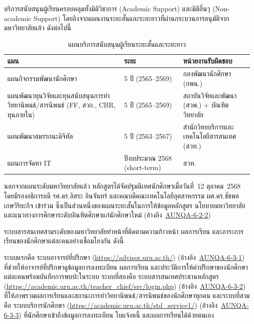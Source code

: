 
บริการสนับสนุนผู้เรียนครอบคลุมทั้งมิติวิชาการ (Academic Support) และมิติอื่นๆ (Non-academic Support) โดยอิงจากแผนงานระยะสั้นและระยะยาวที่ผ่านกระบวนการอนุมัติจากมหาวิทยาลัยแล้ว ดังต่อไปนี้

\begin{table}[H]
  \centering
  \caption{แผนบริการสนับสนุนผู้เรียนระยะสั้นและระยะยาว}
  \label{tbl:support_plans}
  \begingroup
  \footnotesize
  \setlength{\tabcolsep}{3pt}
  \renewcommand{\arraystretch}{1.2}
  \begin{tabularx}{\linewidth}{|>{\raggedright\arraybackslash}X|l|l|}
    \hline
    \textbf{แผน} & \textbf{ระยะ} & \textbf{หน่วยงานรับผิดชอบ} \\
    \hline
    แผนกิจกรรมพัฒนานักศึกษา & 5 ปี (2565--2569) & กองพัฒนานักศึกษา (กพน.) \\
    \hline
    แผนพัฒนาทุนวิจัยและทุนสนับสนุนการทำวิทยานิพนธ์/สารนิพนธ์ (FF, สวก., CBR, ทุนภายใน) & 5 ปี (2565--2569) & สถาบันวิจัยและพัฒนา (สวพ.) + บัณฑิตวิทยาลัย \\
    \hline
    แผนพัฒนาสมรรถนะดิจิทัล & 5 ปี (2563--2567) & สำนักวิทยบริการและเทคโนโลยีสารสนเทศ (สวท.) \\
    \hline
    แผนการจัดหา IT & ปีงบประมาณ 2568 (short-term) & สวท. \\
    \hline
  \end{tabularx}
  \endgroup
\end{table}

นอกจากแผนระดับมหาวิทยาลัยแล้ว หลักสูตรได้จัดปฐมนิเทศนักศึกษาเมื่อวันที่~12 ตุลาคม~2568 โดยมีรองอธิการบดี รศ.ดร.อิสระ อินจันทร์ และคณบดีคณะเทคโนโลยีอุตสาหกรรม ผศ.ดร.ชัชพล เกษวิริยะกิจ เข้าร่วม ซึ่งเป็นส่วนหนึ่งของแผนระยะสั้นในการให้ข้อมูลหลักสูตร นโยบายมหาวิทยาลัย และแนวทางการศึกษาระดับบัณฑิตศึกษาแก่นักศึกษาใหม่ (อ้างอิง~\hyperlink{ref:AUNQA-6-2-2}{AUNQA-6-2-2})


ระบบสารสนเทศสามระดับของมหาวิทยาลัยทำหน้าที่ติดตามความก้าวหน้า ผลการเรียน และภาระการเรียนของนักศึกษาแต่ละคนอย่างเชื่อมโยงกัน ดังนี้

ระบบแรกคือ ระบบอาจารย์ที่ปรึกษา (\url{https://advisor.uru.ac.th/}) (อ้างอิง~\hyperlink{ref:AUNQA-6-3-1}{AUNQA-6-3-1}) ที่ช่วยให้อาจารย์ที่ปรึกษาดูข้อมูลการลงทะเบียน ผลการเรียน และประวัติการให้คำปรึกษาของนักศึกษาแต่ละคนพร้อมบันทึกการพบปะในระบบ ระบบที่สองคือ ระบบสารสนเทศประธานหลักสูตร (\url{https://academic.uru.ac.th/teacher_chief/src/login.php}) (อ้างอิง~\hyperlink{ref:AUNQA-6-3-2}{AUNQA-6-3-2}) ที่ให้ภาพรวมผลการเรียนและสถานะการทำวิทยานิพนธ์/สารนิพนธ์ของนักศึกษาทุกคน และระบบที่สามคือ ระบบบริการนักศึกษา (\url{https://academic.uru.ac.th/std_service1/}) (อ้างอิง~\hyperlink{ref:AUNQA-6-3-3}{AUNQA-6-3-3}) ที่นักศึกษาเข้าถึงข้อมูลการลงทะเบียน ใบแจ้งหนี้ และผลการเรียนได้ด้วยตนเอง

